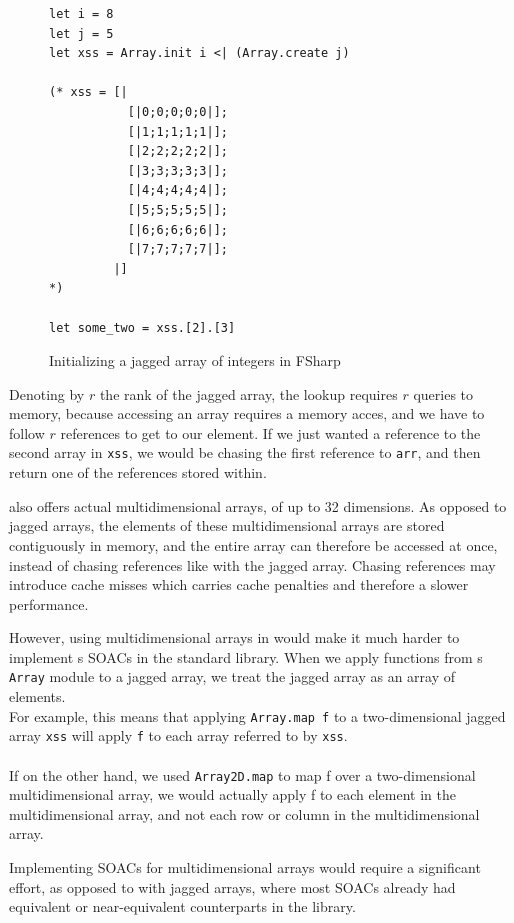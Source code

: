 \begin{figure}[h]
  \centering
\begin{verbatim}
let i = 8
let j = 5
let xss = Array.init i <| (Array.create j) 
  
(* xss = [|
           [|0;0;0;0;0|];
           [|1;1;1;1;1|];
           [|2;2;2;2;2|];
           [|3;3;3;3;3|];
           [|4;4;4;4;4|];
           [|5;5;5;5;5|];
           [|6;6;6;6;6|];
           [|7;7;7;7;7|];
         |]
*) 

let some_two = xss.[2].[3]

\end{verbatim}
  \caption{Initializing a jagged array of integers in FSharp}
  \label{fig:jaggedarrayfsharp}
\end{figure}

Denoting by $r$ the rank of the jagged array, the lookup requires $r$ 
queries to memory, because accessing an array requires a memory acces, 
and we have to follow $r$ references to get to our element. If we just 
wanted a reference to the second array in \texttt{xss}, we would be 
chasing the first reference to \texttt{arr}, and then return one of 
the references stored within.

\fsharp{} also offers actual multidimensional arrays, of up to 32 dimensions.
As opposed to jagged arrays, the elements of these multidimensional arrays are
stored contiguously in memory, and the entire array can therefore be accessed at
once, instead of chasing references like with the jagged array. Chasing
references may introduce cache misses which carries cache penalties and
therefore a slower performance.

However, using multidimensional arrays in \fshark{} would make it much harder to
implement \fshark{}s SOACs in the standard library. 
When we apply functions from \fsharp{}s \texttt{Array} module to a jagged
array, we treat the jagged array as an array of elements.\\
For example, this means that applying \texttt{Array.map f} to a two-dimensional
jagged array \texttt{xss} will apply \texttt{f} to each array referred to by
\texttt{xss}.\\\\
If on the other hand, we used \texttt{Array2D.map} to map f over a
two-dimensional multidimensional array, we would actually apply f to each
element in the multidimensional array, and not each row or column in the
multidimensional array.

Implementing SOACs for multidimensional arrays would require a significant
effort, as opposed to with jagged arrays, where most SOACs already had
equivalent or near-equivalent counterparts in the \fsharp{} library.

